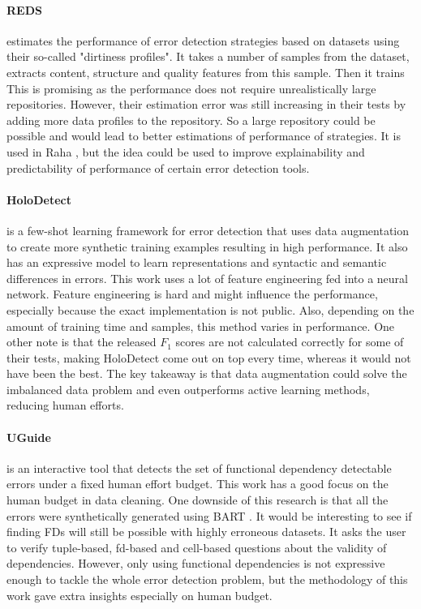 \paragraph{REDS \cite{Mahdavi2019-pk}} estimates the performance of error detection strategies based on datasets using their so-called "dirtiness profiles". It takes a number of samples from the dataset, extracts content, structure and quality features from this sample. Then it trains 
This is promising as the performance does not require unrealistically large repositories. However, their estimation error was still increasing in their tests by adding more data profiles to the repository.
So a large repository could be possible and would lead to better estimations of performance of strategies.
It is used in Raha \cite{Mahdavi2019-zf}, but the idea could be used to improve explainability and predictability of performance of certain error detection tools.


\paragraph{HoloDetect \cite{Heidari2019-ox}} is a few-shot learning framework for error detection that uses data augmentation to create more synthetic training examples resulting in high performance. It also has an expressive model to learn representations and syntactic and semantic differences in errors. This work uses a lot of feature engineering fed into a neural network. Feature engineering is hard and might influence the performance, especially because the exact implementation is not public. Also, depending on the amount of training time and samples, this method varies in performance. One other note is that the released $F_1$ scores are not calculated correctly for some of their tests, making HoloDetect come out on top every time, whereas it would not have been the best. The key takeaway is that data augmentation could solve the imbalanced data problem and even outperforms active learning methods, reducing human efforts. 

\paragraph{UGuide \cite{Thirumuruganathan2017-ip}} is an interactive tool that detects the set of functional dependency detectable errors under a fixed human effort budget. This work has a good focus on the human budget in data cleaning. One downside of this research is that all the errors were synthetically generated using BART \cite{Arocena2015-om}. It would be interesting to see if finding FDs will still be possible with highly erroneous datasets. It asks the user to verify tuple-based, fd-based and cell-based questions about the validity of dependencies. However, only using functional dependencies is not expressive enough to tackle the whole error detection problem, but the methodology of this work gave extra insights especially on human budget.

